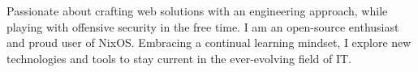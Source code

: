 

\begin{cvparagraph}

Passionate about crafting web solutions with an engineering approach, while playing with offensive security in the free time. I am an open-source enthusiast and proud user of NixOS. Embracing a continual learning mindset, I explore new technologies and tools to stay current in the ever-evolving field of IT.
\end{cvparagraph}
